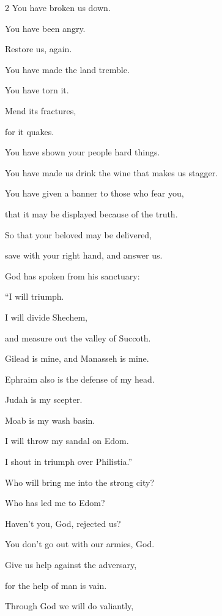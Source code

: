 \begin{multicols}{2}
	You have broken us down.
	
	You have been angry.
	
	Restore us, again.
	
	
	\myverse{}You have made the land tremble.
	
	You have torn it.
	
	Mend its fractures,
	
	for it quakes.
	
	
	\myverse{}You have shown your people hard things.
	
	You have made us drink the wine that makes us stagger.
	
	
	\myverse{}You have given a banner to those who fear you,
	
	that it may be displayed because of the truth.
	
	\vspace{\baselineskip}	
	
	
	\myverse{}So that your beloved may be delivered,
	
	save with your right hand, and answer us.
	
	
	\myverse{}God has spoken from his sanctuary:
	
	“I will triumph.
	
	I will divide Shechem,
	
	and measure out the valley of Succoth.
	
	
	\myverse{}Gilead is mine, and Manasseh is mine.
	
	Ephraim also is the defense of my head.
	
	Judah is my scepter.
	
	
	\myverse{}Moab is my wash basin.
	
	I will throw my sandal on Edom.
	
	I shout in triumph over Philistia.”
	
	\vspace{\baselineskip}
	
	\myverse{}Who will bring me into the strong city?
	
	Who has led me to Edom?
	
	
	\myverse{}Haven’t you, God, rejected us?
	
	You don’t go out with our armies, God.
	
	
	\myverse{}Give us help against the adversary,
	
	for the help of man is vain.
	
	
	\myverse{}Through God we will do valiantly,
	

\end{multicols}
